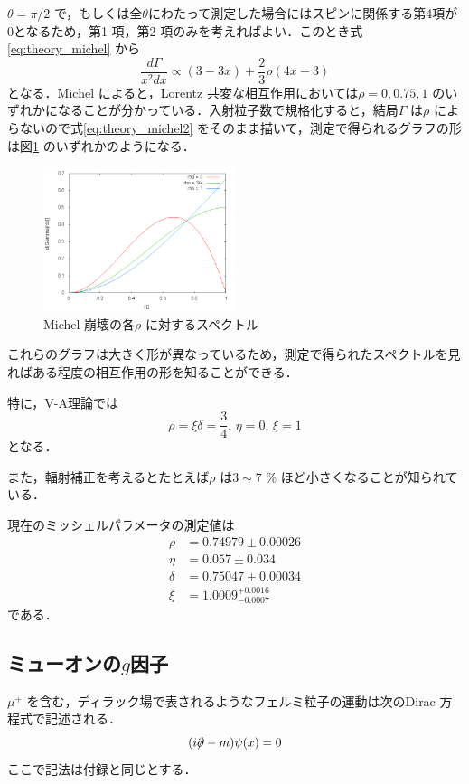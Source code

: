 	$\theta = \pi/2$ で，もしくは全$\theta$にわたって測定した場合にはスピンに関係する第4項が0となるため，第1 項，第2 項のみを考えればよい．このとき式\eqref{eq:theory_michel} から
	\begin{equation}
	\frac{d\Gamma}{x^{2}dx} \propto (3 - 3x) + \frac{2}{3}\rho (4x - 3)
	\label{eq:theory_michel2}
	\end{equation}
	となる．Michel \cite{michel_origin}
によると，Lorentz 共変な相互作用においては$\rho = 0, 0.75, 1$ のいずれかになることが分かっている．\cite{micher_interaction}入射粒子数で規格化すると，結局$\Gamma$ は$\rho$ によらないので式\eqref{eq:theory_michel2} をそのまま描いて，測定で得られるグラフの形は図\ref{zu:michelpar} のいずれかのようになる．

	\begin{figure}[htbp]
	\centering
	\includegraphics[width = 0.5\textwidth]{figure/abe/michelgraph.png}
	\caption{Michel 崩壊の各$\rho$ に対するスペクトル}
	\label{zu:michelpar}
	\end{figure}
	これらのグラフは大きく形が異なっているため，測定で得られたスペクトルを見ればある程度の相互作用の形を知ることができる．

	特に，V-A理論では%
	\[ \rho = \xi\delta = \frac{3}{4},\, \eta = 0,\, \xi = 1 \]
	となる．

	また，輻射補正を考えるとたとえば$\rho$ は$3 \sim 7$ \% ほど小さくなることが知られている．

	現在のミッシェルパラメータの測定値は
	\begin{align*}
	\rho &= 0.74979 \pm 0.00026\\
	\eta &= 0.057 \pm 0.034\\
	\delta &= 0.75047 \pm 0.00034\\
	\xi &= 1.0009^{+0.0016}_{-0.0007}
	\end{align*}
	である．\cite{PDG}
	
	\subsection{ミューオンの$g$因子}
	$\mu^{+}$ を含む，ディラック場で表されるようなフェルミ粒子の運動は次のDirac 方程式で記述される．
	\begin{equation}
	(i\Slash{\partial} - m)\psi(x) = 0
	\label{eq:theory_dirac}
	\end{equation}
        ここで記法は付録と同じとする．

